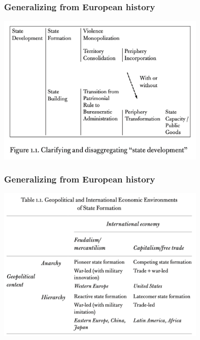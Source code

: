 \documentclass[utf8, xcolor=dvipsnames, handout]{beamer}
\begin{document}
\begin{frame}
\frametitle{Generalizing from European history}
\centering

\includegraphics[width = 0.75\textwidth]{img/mazzuca_table1}

\end{frame}

\begin{frame}
\frametitle{Generalizing from European history}
\centering

\includegraphics[width = 0.75\textwidth]{img/mazzuca_table2}

\end{frame}
\end{document}
